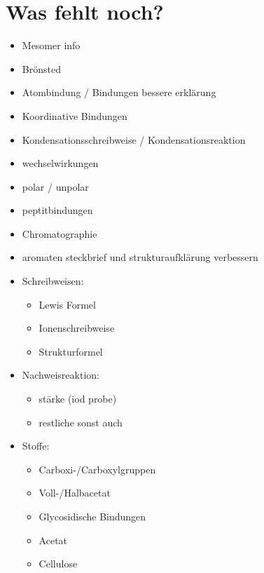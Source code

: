 
\chapter{Was fehlt noch?}
\begin{itemize}
    \item Mesomer info
    \item Brönsted
    \item Atombindung / Bindungen bessere erklärung
    \item Koordinative Bindungen
    \item Kondensationsschreibweise / Kondensationsreaktion
    \item wechselwirkungen
    \item polar / unpolar
    \item peptitbindungen
    \item Chromatographie
    \item aromaten steckbrief und strukturaufklärung verbessern

    \item Schreibweisen:
    \begin{itemize}
        \item Lewis Formel
        \item Ionenschreibweise
        \item Strukturformel
    \end{itemize}

    \item Nachweisreaktion:
    \begin{itemize}
        \item stärke (iod probe)
        \item restliche sonst auch
    \end{itemize}

    \item Stoffe:
    \begin{itemize}
        \item Carboxi-/Carboxylgruppen
        \item Voll-/Halbacetat
        \item Glycosidische Bindungen
        \item Acetat
        \item Cellulose
    \end{itemize}
\end{itemize}

